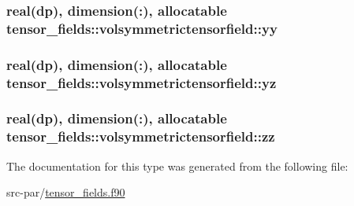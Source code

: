 \hypertarget{structtensor__fields_1_1volsymmetrictensorfield_a98f92f6c0d5a0e8f32ffd0f4de662e57}{
\subsubsection[{yy}]{\setlength{\rightskip}{0pt plus 5cm}real(dp), dimension(\-:), allocatable tensor\-\_\-fields\-::volsymmetrictensorfield\-::yy}}\label{structtensor__fields_1_1volsymmetrictensorfield_a98f92f6c0d5a0e8f32ffd0f4de662e57}
\hypertarget{structtensor__fields_1_1volsymmetrictensorfield_a717f4d4ef254e9f556349e03fd65b94d}{
\subsubsection[{yz}]{\setlength{\rightskip}{0pt plus 5cm}real(dp), dimension(\-:), allocatable tensor\-\_\-fields\-::volsymmetrictensorfield\-::yz}}\label{structtensor__fields_1_1volsymmetrictensorfield_a717f4d4ef254e9f556349e03fd65b94d}
\hypertarget{structtensor__fields_1_1volsymmetrictensorfield_a642d025aeabf20d8cb7890e5d6b6d813}{
\subsubsection[{zz}]{\setlength{\rightskip}{0pt plus 5cm}real(dp), dimension(\-:), allocatable tensor\-\_\-fields\-::volsymmetrictensorfield\-::zz}}\label{structtensor__fields_1_1volsymmetrictensorfield_a642d025aeabf20d8cb7890e5d6b6d813}


The documentation for this type was generated from the following file\-:\begin{DoxyCompactItemize}
\item 
src-\/par/\hyperlink{tensor__fields_8f90}{tensor\-\_\-fields.\-f90}\end{DoxyCompactItemize}

